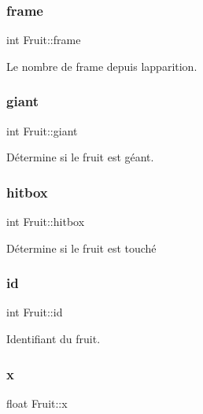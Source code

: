 \subsubsection{\texorpdfstring{frame}{frame}}
{\footnotesize\ttfamily int Fruit\+::frame}



Le nombre de frame depuis l\textquotesingle{}apparition. 

\mbox{\label{struct_fruit_acc2ff34be47aa68ba9cec0f497b3eef1}} 
\subsubsection{\texorpdfstring{giant}{giant}}
{\footnotesize\ttfamily int Fruit\+::giant}



Détermine si le fruit est géant. 

\mbox{\label{struct_fruit_ad5ce4a532379874dc475ec24b07af673}} 
\subsubsection{\texorpdfstring{hitbox}{hitbox}}
{\footnotesize\ttfamily int Fruit\+::hitbox}



Détermine si le fruit est touché 

\mbox{\label{struct_fruit_af1da6ce5a7b5410ff657800b2fa25d55}} 
\subsubsection{\texorpdfstring{id}{id}}
{\footnotesize\ttfamily int Fruit\+::id}



Identifiant du fruit. 

\mbox{\label{struct_fruit_a3d27e03eee7dbd48ee8913bf3926723b}} 
\subsubsection{\texorpdfstring{x}{x}}
{\footnotesize\ttfamily float Fruit\+::x}



